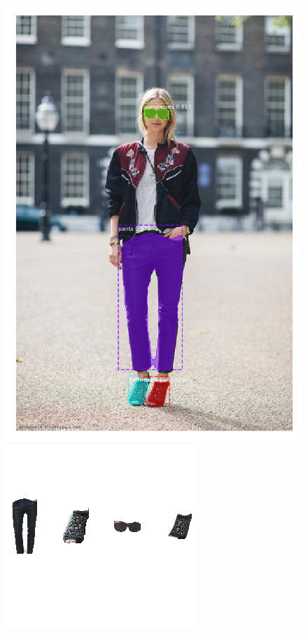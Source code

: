 \documentclass[12pt]{report}
\begin{document}
\begin{figure}
\begin{minipage}[b]{0.3\textwidth}
    \includegraphics[width=\textwidth]{images/resultados/1060077roupas.png}
  \end{minipage}
    \hfill
  \begin{minipage}[b]{0.3\textwidth}
    \includegraphics[width=\textwidth]{images/resultados/1.png}

\end{minipage}
\end{figure}
\end{document}
